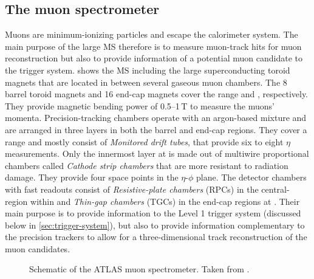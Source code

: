 \subsection{The muon spectrometer}
Muons are minimum-ionizing particles and escape the calorimeter system.
The main purpose of the large MS therefore is to measure muon-track hits for muon reconstruction but also to provide information of a potential muon candidate to the trigger system.
 shows the MS including the large superconducting toroid magnets that are located in between several gaseous muon chambers.
The 8 barrel toroid magnets and 16 end-cap magnets cover the range  and , respectively. They provide magnetic bending power of \numrange{0.5}{1}\,T to measure the muons' momenta. Precision-tracking chambers operate with an argon-based mixture and are arranged in three layers in both the barrel and end-cap regions. They cover a range  and mostly consist of \emph{Monitored drift tubes}, that provide six to eight $\eta$ measurements. Only the innermost layer at  is made out of multiwire proportional chambers called \emph{Cathode strip chambers} that are more resistant to radiation damage. They provide four space points in the $\eta$-$\phi$ plane. The detector chambers with fast readouts consist of \emph{Resistive-plate chambers} (RPCs) in the central-region within  and \emph{Thin-gap chambers} (TGCs) in the end-cap regions at .
Their main purpose is to provide information to the Level 1 trigger system (discussed below in \cref{sec:trigger-system}), but also to provide information complementary to the precision trackers to allow for a three-dimensional track reconstruction of the muon candidates.


\FloatBarrier
\begin{figure}[t]
    \caption[Schematic of the ATLAS muon spectrometer.]{Schematic of the ATLAS muon spectrometer. Taken from .}
    \label{fig:ATLASmuonspectrometer}
\end{figure}



